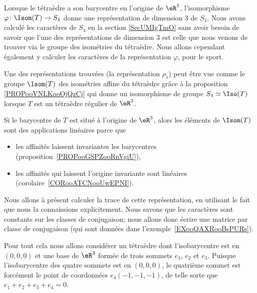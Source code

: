 \begin{normaltext}
	Lorsque le tétraèdre a son barycentre en l'origine de \( \eR^3\), l'isomorphisme \( \varphi\colon \Isom(T)\to S_4\) donne une représentation de dimension \( 3\) de \( S_4\). Nous avons calculé les caractères de \( S_4\) en la section \ref{SecUMIgTmO} sans avoir besoin de savoir que l'une des représentations de dimension \( 3\) est celle que nous venons de trouver via le groupe des isométries du tétraèdre. Nous allons cependant également y calculer les caractères de la représentation \( \varphi\), pour le sport.
\end{normaltext}

Une des représentations trouvées (la représentation \( \rho_s\)) peut être vue comme le groupe \( \Isom(T)\) des isométries affine du tétraèdre grâce à la proposition \ref{PROPooVNLKooOjQzCj} qui donne un isomorphisme de groupe \( S_4\simeq \Iso(T)\) lorsque \( T\) est un tétraèdre régulier de \( \eR^3\).

Si le barycentre de \( T\) est situé à l'origine de \( \eR^3\), alors les éléments de \( \Isom(T)\) sont des applications linéaires parce que
\begin{itemize}
	\item les affinités laissent invariantes les barycentres (proposition~\ref{PROPooGSPZooRnVgiU}),
	\item les affinités qui laissent l'origine invariante sont linéaires (corolaire~\ref{CORooATCNooUwEPNI}).
\end{itemize}
Nous allons à présent calculer la trace de cette représentation, en utilisant le fait que nous la connaissions explicitement. Nous savons que les caractères sont constants sur les classes de conjugaison; nous allons donc écrire une matrice par classe de conjugaison (qui sont données dans l'exemple~\ref{EXooQAXRooBsPURs}).

Pour tout cela nous allons considérer un tétraèdre dont l'isobarycentre est en \( (0,0,0)\) et une base de \( \eR^3\) formée de trois sommets \( e_1\), \( e_2\) et \( e_3\). Puisque l'isobarycentre des quatre sommets est en \( (0,0,0)\), le quatrième sommet est forcément le point de coordonnées \( e_4(-1,-1,-1)\), de telle sorte que \( e_1+e_2+e_3+e_4=0\).

